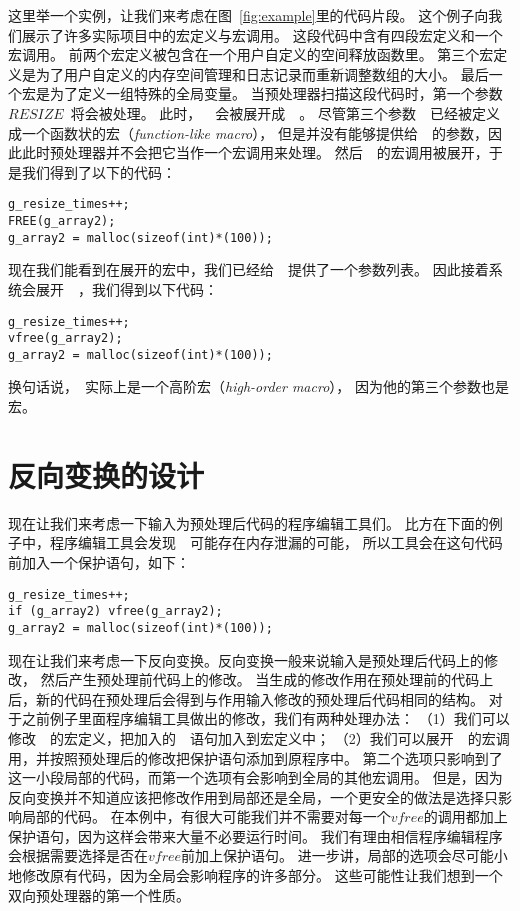 这里举一个实例，让我们来考虑在图~\ref{fig:example}里的代码片段。
这个例子向我们展示了许多实际项目中的宏定义与宏调用。
这段代码中含有四段宏定义和一个宏调用。
前两个宏定义被包含在一个用户自定义的空间释放函数里。
第三个宏定义是为了用户自定义的内存空间管理和日志记录而重新调整数组的大小。
最后一个宏是为了定义一组特殊的全局变量。
当预处理器扫描这段代码时，第一个参数~$RESIZE$~将会被处理。
此时，~~会被展开成~~。
尽管第三个参数~~已经被定义成一个函数状的宏（\emph{function-like macro}），
但是并没有能够提供给~~的参数，因此此时预处理器并不会把它当作一个宏调用来处理。
然后~~的宏调用被展开，于是我们得到了以下的代码：
\begin{lstlisting}
g_resize_times++;
FREE(g_array2);
g_array2 = malloc(sizeof(int)*(100));
\end{lstlisting}
现在我们能看到在展开的宏中，我们已经给~~提供了一个参数列表。
因此接着系统会展开~~，我们得到以下代码：
\begin{lstlisting}
g_resize_times++;
vfree(g_array2);
g_array2 = malloc(sizeof(int)*(100));
\end{lstlisting}
换句话说，~实际上是一个高阶宏（\emph{high-order macro}），
因为他的第三个参数也是宏。

\section{反向变换的设计}
现在让我们来考虑一下输入为预处理后代码的程序编辑工具们。
比方在下面的例子中，程序编辑工具会发现~~可能存在内存泄漏的可能，
所以工具会在这句代码前加入一个保护语句，如下：
\begin{lstlisting}
g_resize_times++;
if (g_array2) vfree(g_array2);
g_array2 = malloc(sizeof(int)*(100));
\end{lstlisting}

现在让我们来考虑一下反向变换。反向变换一般来说输入是预处理后代码上的修改，
然后产生预处理前代码上的修改。
当生成的修改作用在预处理前的代码上后，新的代码在预处理后会得到与作用输入修改的预处理后代码相同的结构。
对于之前例子里面程序编辑工具做出的修改，我们有两种处理办法：
（1）我们可以修改~~的宏定义，把加入的~~语句加入到宏定义中；
（2）我们可以展开~~的宏调用，并按照预处理后的修改把保护语句添加到原程序中。
第二个选项只影响到了这一小段局部的代码，而第一个选项有会影响到全局的其他宏调用。
但是，因为反向变换并不知道应该把修改作用到局部还是全局，一个更安全的做法是选择只影响局部的代码。
在本例中，有很大可能我们并不需要对每一个$vfree$的调用都加上保护语句，因为这样会带来大量不必要运行时间。
我们有理由相信程序编辑程序会根据需要选择是否在$vfree$前加上保护语句。
进一步讲，局部的选项会尽可能小地修改原有代码，因为全局会影响程序的许多部分。
这些可能性让我们想到一个双向预处理器的第一个性质。

